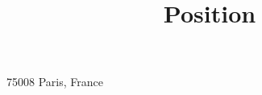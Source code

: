 \title{\customMarginExtraExtraLarge\textnormal{Position}}
\address{\textnormal{55-57 Rue du Faubourg-Saint-Honoré}}{\textnormal{75008 Paris, France}}
